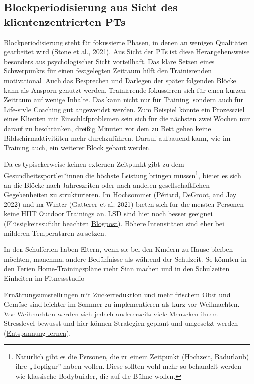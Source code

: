 \documentclass[
  letterpaper,
  DIV=11,
  numbers=noendperiod]{scrreprt}
\begin{document}
\subsection{Blockperiodisierung aus Sicht des klientenzentrierten
PTs}\label{blockperiodisierung-aus-sicht-des-klientenzentrierten-pts}

Blockperiodisierung steht für fokussierte Phasen, in denen an wenigen
Qualitäten gearbeitet wird (Stone et al., 2021). Aus Sicht der PTs ist
diese Herangehensweise besonders aus psychologischer Sicht vorteilhaft.
Das klare Setzen eines Schwerpunkts für einen festgelegten Zeitraum
hilft den Trainierenden motivational. Auch das Besprechen und Darlegen
der später folgenden Blöcke kann als Ansporn genutzt werden.
Trainierende fokussieren sich für einen kurzen Zeitraum auf wenige
Inhalte. Das kann nicht nur für Training, sondern auch für Life-style
Coaching gut angewendet werden. Zum Beispiel könnte ein Prozessziel
eines Klienten mit Einschlafproblemen sein sich für die nächsten zwei
Wochen nur darauf zu beschränken, dreißig Minuten vor dem zu Bett gehen
keine Bildschirmaktivitäten mehr durchzuführen. Darauf aufbauend kann,
wie im Training auch, ein weiterer Block gebaut werden.

Da es typischerweise keinen externen Zeitpunkt gibt zu dem
Gesundheitssportler*innen die höchste Leistung bringen
müssen\footnote{Natürlich gibt es die Personen, die zu einem Zeitpunkt
  (Hochzeit, Badurlaub) ihre „Topfigur'' haben wollen. Diese sollten
  wohl mehr so behandelt werden wie klassische Bodybuilder, die auf die
  Bühne wollen.}, bietet es sich an die Blöcke nach Jahreszeiten oder
nach anderen gesellschaftlichen Gegebenheiten zu strukturieren. Im
Hochsommer (Périard, DeGroot, and Jay 2022) und im Winter (Gatterer et
al. 2021) bieten sich für die meisten Personen keine HIIT Outdoor
Trainings an. LSD sind hier noch besser geeignet (Flüssigkeitszufuhr
beachten
\href{https://www.embodymate.at/2020/08/21/wasser-1-gesundheit-und-trinkmenge/}{Blogpost}).
Höhere Intensitäten sind eher bei milderen Temperaturen zu setzen.

In den Schulferien haben Eltern, wenn sie bei den Kindern zu Hause
bleiben möchten, manchmal andere Bedürfnisse als während der Schulzeit.
So könnten in den Ferien Home-Trainingspläne mehr Sinn machen und in den
Schulzeiten Einheiten im Fitnessstudio.

Ernährungsumstellungen mit Zuckerreduktion und mehr frischem Obst und
Gemüse sind leichter im Sommer zu implementieren als kurz vor
Weihnachten. Vor Weihnachten werden sich jedoch andererseits viele
Menschen ihrem Stresslevel bewusst und hier können Strategien geplant
und umgesetzt werden
(\href{https://www.embodymate.at/2020/12/24/entspannung-erlernen/}{Entspannung
lernen}).
\end{document}
